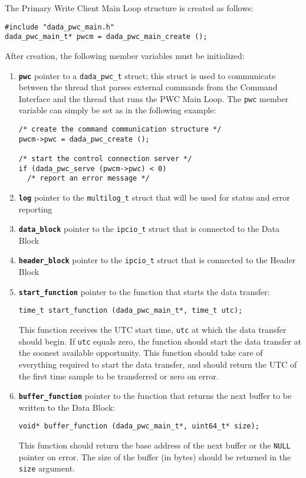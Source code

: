 The Primary Write Client Main Loop structure is created as follows:
\begin{verbatim}
#include "dada_pwc_main.h"
dada_pwc_main_t* pwcm = dada_pwc_main_create ();
\end{verbatim}
After creation, the following member variables must be initialized:
\begin{enumerate}

\item {\bf {\tt pwc}} pointer to a {\tt dada\_pwc\_t} struct; 
   this struct is used to communicate between the thread that parses
   external commands from the Command Interface and the thread that
   runs the PWC Main Loop.  The {\tt pwc} member variable can simply
   be set as in the following example:
\begin{verbatim}
/* create the command communication structure */
pwcm->pwc = dada_pwc_create ();

/* start the control connection server */
if (dada_pwc_serve (pwcm->pwc) < 0)
  /* report an error message */
\end{verbatim}

\item {\bf {\tt log}} pointer to the {\tt multilog\_t} struct
	that will be used for status and error reporting

\item {\bf {\tt data\_block}} pointer to the {\tt ipcio\_t} struct 
	that is connected to the Data Block

\item {\bf {\tt header\_block}} pointer to the {\tt ipcio\_t} struct
	that is connected to the Header Block

\item {\bf {\tt start\_function}} pointer to the function that starts the 
  data transfer:
\begin{verbatim}
time_t start_function (dada_pwc_main_t*, time_t utc);
\end{verbatim}
  This function receives the UTC start time, {\tt utc} at which the
  data transfer should begin.  If {\tt utc} equals zero, the function
  should start the data transfer at the soonest available opportunity.
  This function should take care of everything required to start the
  data transfer, and should return the UTC of the first time sample to
  be transferred or zero on error.

\item {\bf {\tt buffer\_function}} pointer to the function that returns
  the next buffer to be written to the Data Block:
\begin{verbatim}
void* buffer_function (dada_pwc_main_t*, uint64_t* size);
\end{verbatim}
  This function should return the base address of the next buffer or
  the {\tt NULL} pointer on error.  The size of the buffer (in bytes)
  should be returned in the {\tt size} argument.


\end{enumerate}
